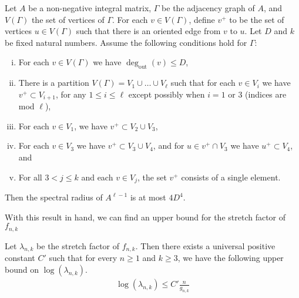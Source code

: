 \begin{lem}
\label{lem:spectral}
Let $A$ be a non-negative integral matrix, $\Gamma$ be the adjacency graph of $A$, and $V(\Gamma)$ the set of
vertices of $\Gamma$. For each $v \in V(\Gamma)$, define $v^+$ to be the set of vertices $u\in V(\Gamma)$ such that there
is an oriented edge from $v$ to $u$. Let $D$ and $k$ be fixed natural numbers. Assume the following conditions
hold for $\Gamma$:
\begin{enumerate}[(i)]
\item For each $v \in V(\Gamma)$ we have $\deg_{\text{out}}(v) \leq D$,
\item There is a partition $V(\Gamma) = V_1 \cup \dots \cup V_\ell$ such that for each $v \in V_i$ we have
  $v^+ \subset V_{i+1}$, for any $1 \leq i \leq \ell$ except possibly when $i = 1$ or 3 (indices are mod $\ell$),
\item For each $v \in V_1$, we have $v^+ \subset V_2 \cup V_3$,
\item For each $v \in V_3$ we have $v^+ \subset V_3 \cup V_4$, and for $u \in v^+ \cap V_3$ we have
  $u^+ \subset V_4$, and
\item For all $3 < j \leq k$ and each $v \in V_j$, the set $v^+$ consists of a single element.
\end{enumerate}

Then the spectral radius of $A^{\ell-1}$ is at most $4D^4$.

\end{lem}
\noindent With this result in hand, we can find an upper bound for the stretch factor of $f_{n,k}$

\begin{lem}\label{lem:upperbound}
  Let $\lambda_{n,k}$ be the stretch factor of $f_{n,k}$. Then there exists a universal positive constant $C'$ such that for every $n \geq 1$ and $k \geq 3$, we have the following upper bound on $\log(\lambda_{n,k})$.
  \begin{align*}
   \log(\lambda_{n,k}) \leq C'\frac{n}{g_{n,k}}
  \end{align*}
\end{lem}

